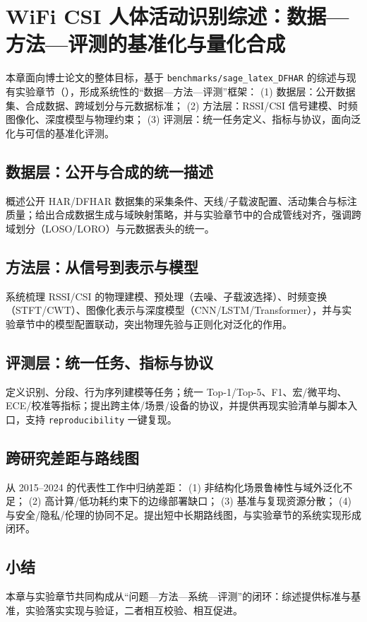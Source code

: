 \chapter{WiFi CSI 人体活动识别综述：数据—方法—评测的基准化与量化合成}
\label{chap:review}

本章面向博士论文的整体目标，基于 \texttt{benchmarks/sage\_latex\_DFHAR} 的综述与现有实验章节（），形成系统性的“数据—方法—评测”框架：
(1) 数据层：公开数据集、合成数据、跨域划分与元数据标准；
(2) 方法层：RSSI/CSI 信号建模、时频图像化、深度模型与物理约束；
(3) 评测层：统一任务定义、指标与协议，面向泛化与可信的基准化评测。

\section{数据层：公开与合成的统一描述}
概述公开 HAR/DFHAR 数据集的采集条件、天线/子载波配置、活动集合与标注质量；给出合成数据生成与域映射策略，并与实验章节中的合成管线对齐，强调跨域划分（LOSO/LORO）与元数据表头的统一。

\section{方法层：从信号到表示与模型}
系统梳理 RSSI/CSI 的物理建模、预处理（去噪、子载波选择）、时频变换（STFT/CWT）、图像化表示与深度模型（CNN/LSTM/Transformer），并与实验章节中的模型配置联动，突出物理先验与正则化对泛化的作用。

\section{评测层：统一任务、指标与协议}
定义识别、分段、行为序列建模等任务；统一 Top-1/Top-5、F1、宏/微平均、ECE/校准等指标；提出跨主体/场景/设备的协议，并提供再现实验清单与脚本入口，支持 \texttt{reproducibility} 一键复现。

\section{跨研究差距与路线图}
从 2015–2024 的代表性工作中归纳差距：
(1) 非结构化场景鲁棒性与域外泛化不足；
(2) 高计算/低功耗约束下的边缘部署缺口；
(3) 基准与复现资源分散；
(4) 与安全/隐私/伦理的协同不足。提出短中长期路线图，与实验章节的系统实现形成闭环。

\section{小结}
本章与实验章节共同构成从“问题—方法—系统—评测”的闭环：综述提供标准与基准，实验落实实现与验证，二者相互校验、相互促进。
